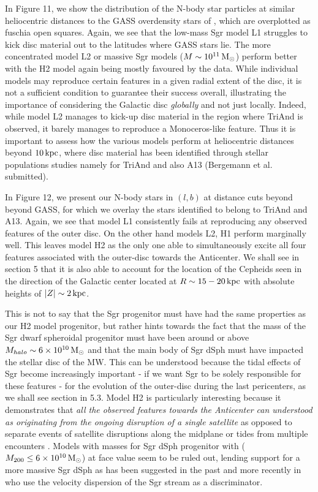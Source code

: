 \documentclass[useAMS,usenatbib]{mnras}
\begin{document}
In Figure 11, we show the distribution of the N-body star particles at similar heliocentric distances to the GASS overdensity stars of \cite{crane03}, which are overplotted as fuschia open squares. Again, we see that the low-mass Sgr model L1 struggles to kick disc material out to the latitudes where GASS stars lie. The more concentrated model L2 or massive Sgr models ($M\sim10^{11}\,\rm{M_{\odot}}$)  perform better with the H2 model again being mostly favoured by the data. While individual models may reproduce certain features in a given radial extent of the disc, it is not a sufficient condition to guarantee their success overall, illustrating the importance of considering the Galactic disc {\it globally} and not just locally. Indeed, while model L2 manages to kick-up disc material in the region where TriAnd is observed, it barely manages to reproduce a Monoceros-like feature. Thus it is important to assess how the various models perform at heliocentric distances beyond $10\,\rm{kpc}$, where disc material has been identified through stellar populations studies \citep{price-whelan15} namely for TriAnd and also A13 (Bergemann et al. submitted). 

In Figure 12, we present  our N-body stars in $(l,b)$ at distance cuts beyond beyond GASS, for which we overlay the stars identified to belong to TriAnd and A13\citep{sheffield14,li17}. Again, we see that model L1 consistently fails at reproducing any observed features of the outer disc. On the other hand models L2, H1 perform marginally well. This leaves model H2 as the only one able to simultaneously excite all four features associated with the outer-disc towards the Anticenter. We shall see in section 5 that it is also able to account for the location of the Cepheids seen in the direction of the Galactic center located at $R\sim15-20\,\rm{kpc}$ with absolute heights of $|Z|\sim2\,\rm{kpc}$.

This is not to say that the Sgr progenitor must have had the same properties as our H2 model progenitor, but rather hints towards the fact that the mass of the Sgr dwarf spheroidal progenitor must have been around or above $M_{halo}\sim6\times10^{10}\, \rm{M_{\odot}}$ and that the main body of Sgr dSph must have impacted the stellar disc of the MW. This can be understood because the tidal effects of Sgr become increasingly important - if we want Sgr to be solely responsible for these features - for the evolution of the outer-disc during the last pericenters, as we shall see section in 5.3. Model H2 is particularly interesting because it demonstrates that {\it all the observed features towards the Anticenter can understood as originating from the ongoing disruption of a single satellite} as opposed to separate events of satellite disruptions \citep{penarrubia10,sheffield14} along the midplane or tides from multiple encounters \citep{kazantzidis08}. Models with masses for Sgr dSph progenitor with ($M_{200}\leq6\times10^{10}\,\rm{M_{\odot}}$) at face value seem to be ruled out, lending support for a more massive Sgr dSph as has been suggested in the past \citep{jiang00} and more recently in \citep{gibbons16} who use the velocity dispersion of the Sgr stream as a discriminator. 
\end{document}
